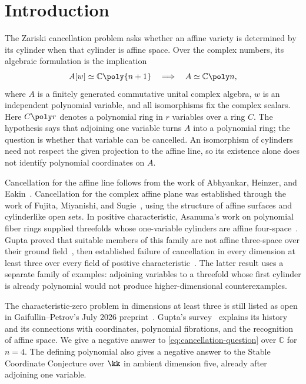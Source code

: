 \section{Introduction}
\label{sec:introduction}

The Zariski cancellation problem asks whether an affine variety is determined
by its cylinder when that cylinder is affine space. Over the complex numbers,
its algebraic formulation is the implication
\begin{equation}
 A[w]\simeq \mathbb C\poly{n+1}
 \quad\Longrightarrow\quad
 A\simeq\mathbb C\poly n,
 \label{eq:cancellation-question}
\end{equation}
where $A$ is a finitely generated commutative unital complex algebra, $w$ is
an independent polynomial variable, and all isomorphisms fix the complex
scalars. Here $C\poly r$ denotes a polynomial ring in $r$ variables over a
ring $C$. The hypothesis says that adjoining one variable turns $A$ into a
polynomial ring; the question is whether that variable can be cancelled.
An isomorphism of cylinders need not respect the given projection to the
affine line, so its existence alone does not identify polynomial
coordinates on $A$.

Cancellation for the affine line follows from the work of Abhyankar,
Heinzer, and Eakin~\cite[Corollary~(2.8)]{AEH}. Cancellation for the
complex affine plane was established through the work of Fujita,
Miyanishi, and Sugie~\cite{Fujita,MiyanishiSugie}, using the structure of
affine surfaces and cylinderlike open sets. In positive characteristic,
Asanuma's work on polynomial fiber rings supplied threefolds whose
one-variable cylinders are affine four-space~\cite{Asanuma}. Gupta
proved that suitable members of this family are not affine three-space
over their ground field~\cite{GuptaThreefold}, then established failure
of cancellation in every dimension at least three over every field of
positive characteristic~\cite{GuptaPositive}. The latter result uses a
separate family of examples: adjoining variables to a threefold whose
first cylinder is already polynomial would not produce higher-dimensional
counterexamples.

The characteristic-zero problem in dimensions at least three is still
listed as open in Gaifullin--Petrov's July 2026
preprint~\cite[p.~1]{GaifullinPetrov}. Gupta's
survey~\cite{GuptaSurvey} explains its history and its connections with
coordinates, polynomial fibrations, and the recognition of affine
space. We give a negative answer to \eqref{eq:cancellation-question}
over $\mathbb C$ for $n=4$.
The defining polynomial also gives a negative answer to the Stable
Coordinate Conjecture over $\kk$ in ambient dimension five, already after
adjoining one variable.

